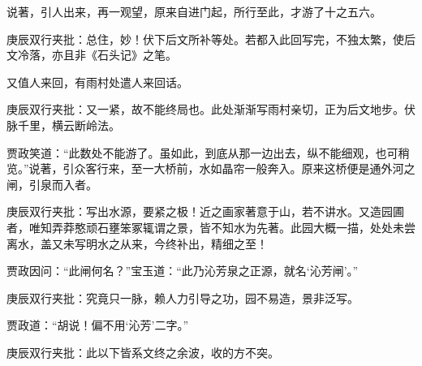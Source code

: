 \begin{parag}
    说著，引人出来，再一观望，原来自进门起，所行至此，才游了十之五六。\begin{note}庚辰双行夹批：总住，妙！伏下后文所补等处。若都入此回写完，不独太繁，使后文冷落，亦且非《石头记》之笔。\end{note}又值人来回，有雨村处遣人来回话。\begin{note}庚辰双行夹批：又一紧，故不能终局也。此处渐渐写雨村亲切，正为后文地步。伏脉千里，横云断岭法。\end{note}贾政笑道：“此数处不能游了。虽如此，到底从那一边出去，纵不能细观，也可稍览。”说著，引众客行来，至一大桥前，水如晶帘一般奔入。原来这桥便是通外河之闸，引泉而入者。\begin{note}庚辰双行夹批：写出水源，要紧之极！近之画家著意于山，若不讲水。又造园圃者，唯知弄莽憨顽石壅笨冢辄谓之景，皆不知水为先著。此园大概一描，处处未尝离水，盖又未写明水之从来，今终补出，精细之至！\end{note}贾政因问：“此闸何名？”宝玉道：“此乃沁芳泉之正源，就名‘沁芳闸’。”\begin{note}庚辰双行夹批：究竟只一脉，赖人力引导之功，园不易造，景非泛写。\end{note}贾政道：“胡说！偏不用‘沁芳’二字。”\begin{note}庚辰双行夹批：此以下皆系文终之余波，收的方不突。\end{note}
\end{parag}


